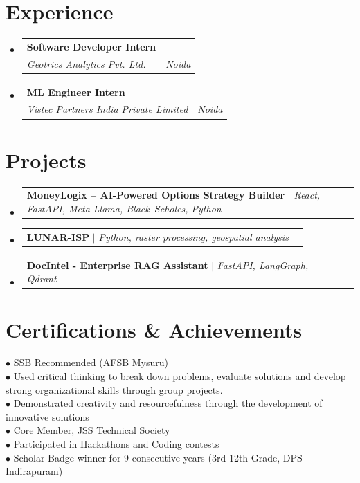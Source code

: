 \documentclass[letterpaper,10pt]{article}
\makeatletter
\newcommand{\resumeSubheading}[4]{
  \vspace{-2pt}\item
    \begin{tabular*}{0.97\textwidth}[t]{l@{\extracolsep{\fill}}r}
      \textbf{#1} & #2 \\
      \textit{\small#3} & \textit{\small #4} \\
    \end{tabular*}\vspace{-7pt}
}
\newcommand{\resumeProjectHeading}[2]{
    \item
    \begin{tabular*}{0.97\textwidth}{l@{\extracolsep{\fill}}r}
      \small#1 & #2 \\
    \end{tabular*}\vspace{-7pt}
}
\newcommand{\resumeSubHeadingListStart}{\begin{itemize}[leftmargin=0.15in, label={}]}
\newcommand{\resumeSubHeadingListEnd}{\end{itemize}}
\newcommand{\resumeItemListStart}{\begin{itemize}}
\newcommand{\resumeItemListEnd}{\end{itemize}\vspace{-5pt}}
\makeatother
\begin{document}
\section{Experience}
  \resumeSubHeadingListStart
          \resumeSubheading
        {Software Developer Intern}{}
        {Geotrics Analytics Pvt. Ltd.}{Noida}
        \resumeItemListStart
                  \resumeItemListEnd
          \resumeSubheading
        {ML Engineer Intern}{}
        {Vistec Partners India Private Limited}{Noida}
        \resumeItemListStart
                  \resumeItemListEnd
      \resumeSubHeadingListEnd

\section{Projects}
    \resumeSubHeadingListStart
              \resumeProjectHeading
          {\textbf{MoneyLogix – AI-Powered Options Strategy Builder} $|$ \emph{React, FastAPI, Meta Llama, Black–Scholes, Python}}{}
          \resumeItemListStart
                      \resumeItemListEnd
              \resumeProjectHeading
          {\textbf{LUNAR-ISP} $|$ \emph{Python, raster processing, geospatial analysis}}{}
          \resumeItemListStart
                      \resumeItemListEnd
              \resumeProjectHeading
          {\textbf{DocIntel - Enterprise RAG Assistant} $|$ \emph{FastAPI, LangGraph, Qdrant}}{}
          \resumeItemListStart
                      \resumeItemListEnd
          \resumeSubHeadingListEnd

\section{Certifications \& Achievements}
  \begin{itemize}[leftmargin=0.15in, label={}]
    \small{\item{
                    $\bullet$ SSB Recommended (AFSB Mysuru) \\
              $\bullet$ Used critical thinking to break down problems, evaluate solutions and develop strong organizational skills through group projects. \\
              $\bullet$ Demonstrated creativity and resourcefulness through the development of innovative solutions \\
              $\bullet$ Core Member, JSS Technical Society \\
              $\bullet$ Participated in Hackathons and Coding contests \\
              $\bullet$ Scholar Badge winner for 9 consecutive years (3rd-12th Grade, DPS-Indirapuram) \\
          }}
  \end{itemize}
\end{document}
